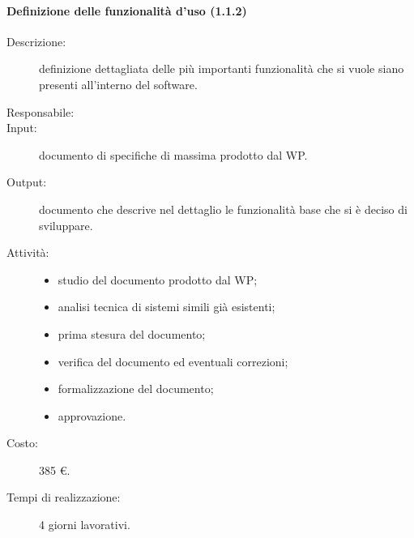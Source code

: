 \paragraph{Definizione delle funzionalità d'uso (1.1.2)}
\begin{description}
\item[Descrizione:] definizione dettagliata delle più importanti funzionalità che si vuole siano presenti all'interno del software.
\item[Responsabile:]
\item[Input:] documento di specifiche di massima prodotto dal WP.
\item[Output:] documento che descrive nel dettaglio le funzionalità base che si è deciso di sviluppare.
\item[Attività:]
\begin{center}
\begin{itemize}
\item studio del documento prodotto dal WP;
\item analisi tecnica di sistemi simili già esistenti;
\item prima stesura del documento;
\item verifica del documento ed eventuali correzioni;
\item formalizzazione del documento;
\item approvazione.
\end{itemize}
\end{center}
\item[Costo:] 385 \euro{}.
\item[Tempi di realizzazione:] 4 giorni lavorativi.
\end{description}

